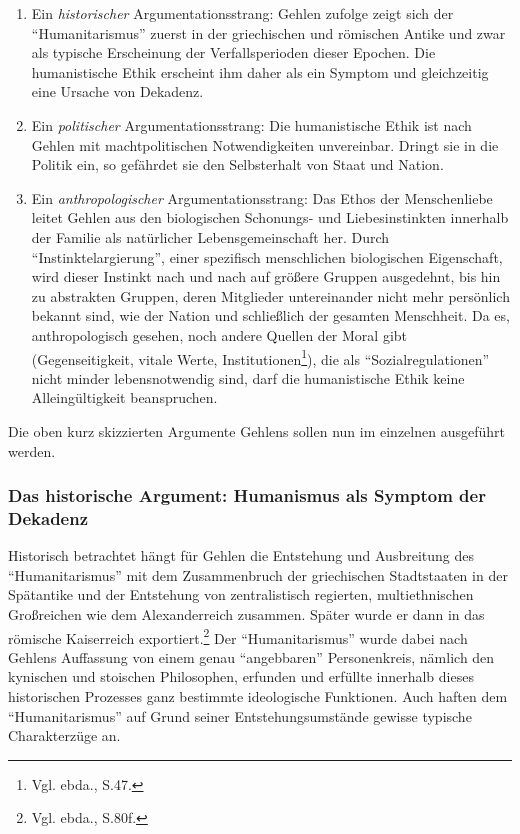 \documentclass[12pt,a4paper]{article}
\begin{document}
\begin{enumerate}
\item Ein {\em historischer} Argumentationsstrang: Gehlen zufolge zeigt sich
  der "`Humanitarismus"' zuerst in der griechischen und römischen Antike und
  zwar als typische Erscheinung der Verfallsperioden dieser Epochen. Die
  humanistische Ethik erscheint ihm daher als ein Symptom und gleichzeitig
  eine Ursache von Dekadenz.
\item Ein {\em politischer} Argumentationsstrang: Die humanistische Ethik ist
  nach Gehlen mit machtpolitischen Notwendigkeiten unvereinbar. Dringt sie in
  die Politik ein, so gefährdet sie den Selbsterhalt von Staat und Nation.
\item Ein {\em anthropologischer} Argumentationsstrang: Das Ethos der
  Menschenliebe leitet Gehlen aus den biologischen Schonungs- und
  Liebesinstinkten innerhalb der Familie als natürlicher Lebensgemeinschaft
  her. Durch "`Instinktelargierung"', einer spezifisch menschlichen
  biologischen Eigenschaft, wird dieser Instinkt nach und nach auf größere
  Gruppen ausgedehnt, bis hin zu abstrakten Gruppen, deren Mitglieder
  untereinander nicht mehr persönlich bekannt sind, wie der Nation und
  schließlich der gesamten Menschheit. Da es, anthropologisch gesehen, noch
  andere Quellen der Moral gibt (Gegenseitigkeit, vitale Werte,
  Institutionen\footnote{Vgl. ebda., S.47.}), die als "`Sozialregulationen"'
  nicht minder lebensnotwendig sind, darf die humanistische Ethik keine
  Alleingültigkeit beanspruchen.
\end{enumerate}

Die oben kurz skizzierten Argumente Gehlens sollen nun im einzelnen
ausgeführt werden.

\subsubsection{Das historische Argument: Humanismus als Symptom der Dekadenz}

Historisch betrachtet hängt für Gehlen die Entstehung und Ausbreitung des
"`Humanitarismus"' mit dem Zusammenbruch der griechischen Stadtstaaten in der
Spätantike und der Entstehung von zentralistisch regierten,
multiethnischen Großreichen wie dem Alexanderreich zusammen. Später wurde
er dann in das römische Kaiserreich exportiert.\footnote{Vgl. ebda., S.80f.}
Der "`Humanitarismus"' wurde dabei nach Gehlens Auffassung von einem genau
"`angebbaren"' Personenkreis, nämlich den kynischen und stoischen
Philosophen, erfunden und erfüllte innerhalb dieses historischen Prozesses
ganz bestimmte ideologische Funktionen. Auch haften dem
"`Humanitarismus"' auf Grund seiner Entstehungsumstände gewisse typische
Charakterzüge an.
\end{document}

